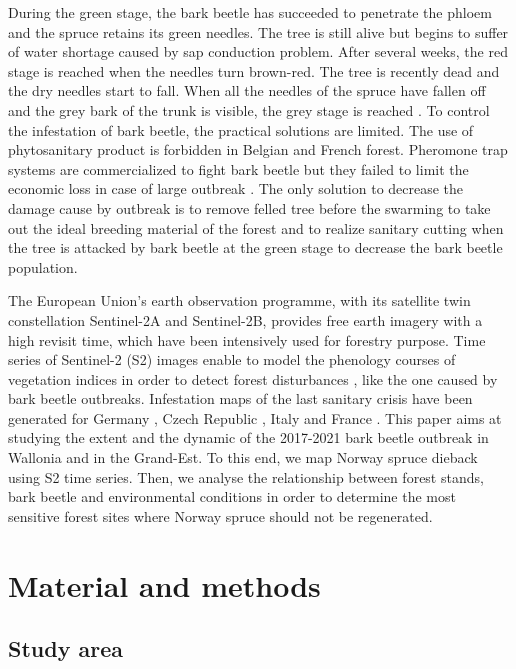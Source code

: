 \documentclass[3p,procedia]{elsarticle}
\begin{document}
During the green stage, the bark beetle has succeeded to penetrate the phloem and the spruce retains its green needles. 
The tree is still alive but begins to suffer of water shortage caused by sap conduction problem. 
After several weeks, the red stage is reached when the needles turn brown-red. The tree is recently dead and the dry needles start to fall.
When all the needles of the spruce have fallen off and the grey bark of the trunk is visible, the grey stage is reached \citep{abdullah_european_2018}. 
To control the infestation of bark beetle, the practical solutions are limited. 
The use of phytosanitary product is forbidden in Belgian and French forest.
Pheromone trap systems are commercialized to fight bark beetle
 but they failed to limit the economic loss in case of large outbreak \citep{kuhn_pheromone_2022}.
The only solution to decrease the damage cause by outbreak is to remove felled tree before the swarming to take out the ideal breeding material of the forest and to realize sanitary cutting when the tree is attacked by bark beetle at the green stage to decrease the bark beetle population. 


The European Union’s earth observation programme, with its satellite twin constellation Sentinel-2A and Sentinel-2B, provides free earth imagery with a high revisit time, which have been intensively used for forestry purpose. 
Time series of Sentinel-2 (S2) images enable to model the phenology courses of vegetation indices in order to detect forest disturbances \citep{low_phenology_2020}, like the one caused by bark beetle outbreaks.
Infestation maps of the last sanitary crisis have been generated for Germany \citep{ali_canopy_2021,thonfeld_first_2022}, Czech Republic \citep{barta_early_2021}, Italy \citep{dalponte_mapping_2022} and France \citep{nardi_drought_2022}. 
This paper aims at studying the extent and the dynamic of the 2017-2021 bark beetle outbreak in Wallonia and in the Grand-Est.
To this end, we map Norway spruce dieback using S2 time series.
Then, we analyse the relationship between forest stands, bark beetle and environmental conditions in order to determine the most sensitive forest sites where Norway spruce should not be regenerated.


\section{Material and methods}
\subsection{Study area}
\end{document}
